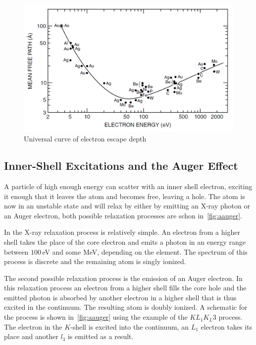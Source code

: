 \documentclass[a4paper,10pt]{scrartcl}
\begin{document}
\begin{figure}
\centering
\includegraphics[scale=0.4]{img/ucurve}
\caption{Universal curve of electron escape depth \label{fig:ucurve}}
\end{figure}

\subsection{Inner-Shell Excitations and the Auger Effect}

A particle of high enough energy can scatter with an inner shell electron, exciting it enough that it leaves the atom and becomes free, leaving a hole. The atom is now in an unstable state and will relax by either by emitting an X-ray photon or an Auger electron, both possible relaxation processes are schon in~\ref{fig:aauger}.

In the X-ray relaxation process is relatively simple. An electron from a higher shell takes the place of the core electron and emits a photon in an energy range between $100\,$eV and some MeV, depending on the element. The spectrum of this process is discrete and the remaining atom is singly ionized.

The second possible relaxation process is the emission of an Auger electron. In this relaxation process an electron from a higher shell fills the core hole and the emitted photon is absorbed by another electron in a higher shell that is thus excited in the continuum. The resulting atom is doubly ionized. A schematic for the process is shown in~\ref{fig:aauger} using the example of the $KL_{1}K_L{3}$ process. The electron in the $K$-shell is excited into the continuum, an $L_1$ electron takes its place and another $l_3$ is emitted as a result.
\end{document}

